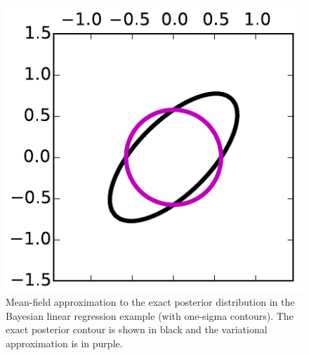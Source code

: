 \begin{figure}
\centering
\includegraphics[width=0.25\linewidth]{Chapter2/vi/mean_field.pdf}
\caption{Mean-field approximation to the exact posterior distribution in the Bayesian linear regression example (with one-sigma contours). The exact posterior contour is shown in black and the variational approximation is in purple.}
\label{fig:chap2_mean_field}
\end{figure}


